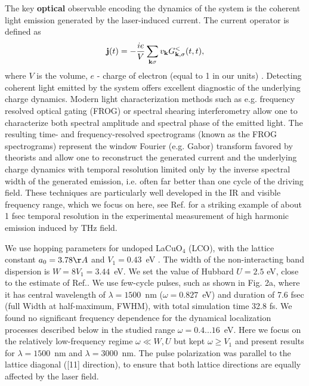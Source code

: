 \documentclass[prb,aps,twocolumn,showpacs,amsmath,amssymb]{revtex4}%
\begin{document}
The key {\bf optical} observable encoding the 
dynamics of the system is
the coherent light emission generated 
by the laser-induced current. The current operator is defined as
\begin{equation}
\label{Current}
{\bf j}(t)=-\dfrac{ie}{V}\sum_{{\bf k} \sigma} v_{\bf k} G_{{\bf k},\sigma}^{<}(t,t),
\end{equation}
where $V$ is the volume, $e$ - charge of electron (equal to 1 in our units)\cite{Eckstein_1}
. 
Detecting coherent light emitted by the system 
offers excellent diagnostic of the underlying 
charge dynamics. Modern light characterization methods 
such as e.g. 
frequency resolved optical gating (FROG) \cite{Trebino_1997, Kane_1993} 
or spectral shearing interferometry \cite{Iaconis_1998} allow one to characterize both 
spectral amplitude and  spectral phase of
the emitted light.
The resulting time- and frequency-resolved  
spectrograms (known as the FROG spectrograms)  
represent the window Fourier (e.g. Gabor) transform 
favored by theorists and allow one to reconstruct the 
generated current and the underlying charge dynamics with
temporal resolution limited only by the inverse spectral 
width of the generated emission, i.e. often 
far better than one cycle of the driving field. These techniques
are particularly well developed in the IR and visible frequency
range, which we focus on here, see Ref.\cite{RupertHuber_2015} for a 
striking example of about 1 fsec temporal resolution in
the experimental measurement of high harmonic
emission induced by THz field. 




We use hopping parameters for undoped 
LaCuO$_4$ (LCO), with the lattice constant $a_{0}=3.78\AA$ and
$V_1=0.43$~eV \cite{Markiewicz}. 
The width of the
non-interacting band dispersion is $W=8V_1=3.44$~eV.  
We set the value of Hubbard $U=2.5$ eV,  
close to the estimate of  Ref.\cite{Delannoy}.
We use few-cycle pulses, such as
shown in Fig. 2a, where it has central 
wavelength of $\lambda=1500$~nm ($\omega=0.827$~eV) and
duration of 7.6 fsec (full Width at half-maximum, FWHM), with
total simulation time 32.8 fs. We found no significant frequency dependence for the dynamical localization processes 
described below in the studied range 
$\omega=0.4...16$~eV. Here we focus on the 
relatively low-frequency regime $\omega\ll W,U$
but kept $\omega\geq V_1$ and present results for
$\lambda=1500$~nm and $\lambda=3000$~nm.
The pulse polarization was parallel to the lattice diagonal ([11] direction), to ensure that both lattice directions are
equally affected by the laser field. 
\end{document}
